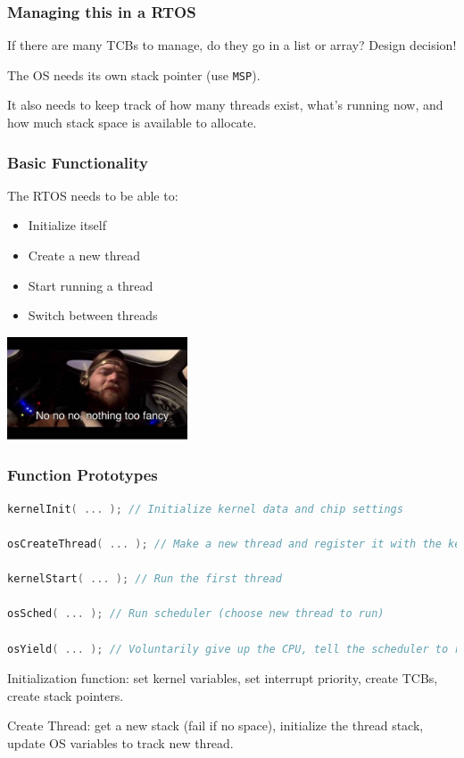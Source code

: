 \begin{frame}
\frametitle{Managing this in a RTOS}

If there are many TCBs to manage, do they go in a list or array? Design decision!

The OS needs its own stack pointer (use \texttt{MSP}).

It also needs to keep track of how many threads exist, what's running now, and how much stack space is available to allocate.


\end{frame}


\begin{frame}
\frametitle{Basic Functionality}

The RTOS needs to be able to:

\begin{itemize}
	\item Initialize itself
	\item Create a new thread
	\item Start running a thread
	\item Switch between threads
\end{itemize}

\begin{center}
	\includegraphics[width=0.4\textwidth]{images/fancy.jpg}
\end{center}


\end{frame}


\begin{frame}[fragile]
\frametitle{Function Prototypes}

\begin{lstlisting}[language=C]
kernelInit( ... ); // Initialize kernel data and chip settings

osCreateThread( ... ); // Make a new thread and register it with the kernel

kernelStart( ... ); // Run the first thread

osSched( ... ); // Run scheduler (choose new thread to run)

osYield( ... ); // Voluntarily give up the CPU, tell the scheduler to run

\end{lstlisting}

Initialization function: set kernel variables, set interrupt priority, create TCBs, create stack pointers.

Create Thread: get a new stack (fail if no space), initialize the thread stack, update OS variables to track new thread.

\end{frame}


